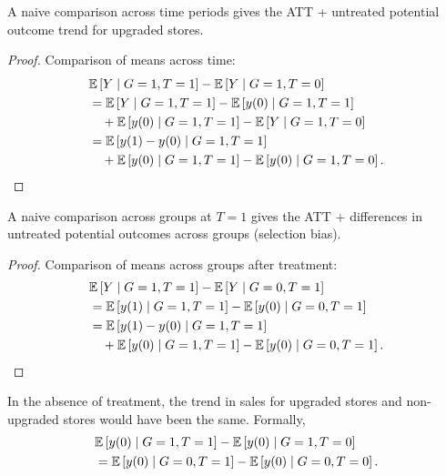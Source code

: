\begin{proposition}
	A naive comparison across time periods gives the ATT + untreated potential outcome trend for upgraded stores.
\end{proposition}
\begin{proof}
	Comparison of means across time:
	\begin{align*}
		&\mathbb{E}\left[Y \mid G=1, T=1\right] - \mathbb{E}\left[Y \mid G=1, T=0\right] \\
		&= \mathbb{E}\left[Y \mid G=1, T=1\right] - \mathbb{E}\left[y(0) \mid G=1, T=1\right] \\
		&\quad + \mathbb{E}\left[y(0) \mid G=1, T=1\right] - \mathbb{E}\left[Y \mid G=1, T=0\right] \\
		&= \mathbb{E}\left[y(1)-y(0) \mid G=1, T=1\right] \\
		&\quad + \mathbb{E}\left[y(0) \mid G=1, T=1\right] - \mathbb{E}\left[y(0) \mid G=1, T=0\right]
	.\end{align*}
\end{proof}

\begin{proposition}
	A naive comparison across groups at $T=1$ gives the ATT + differences in untreated potential outcomes across groups (selection bias).
\end{proposition}
\begin{proof}
	Comparison of means across groups after treatment:
	\begin{align*}
		&\mathbb{E}\left[Y \mid G=1, T=1\right] - \mathbb{E}\left[Y \mid G=0, T=1\right]\\
		&= \mathbb{E}\left[y(1) \mid G=1, T=1\right] - \mathbb{E}\left[y(0) \mid G=0, T=1\right] \\
		&= \mathbb{E}\left[y(1)-y(0) \mid G=1, T=1\right] \\
		&\quad + \mathbb{E}\left[y(0) \mid G=1, T=1\right] - \mathbb{E}\left[y(0) \mid G=0, T=1\right]
	.\end{align*}
\end{proof}

\begin{assumption}
	In the absence of treatment, the trend in sales for upgraded stores and non-upgraded stores would have been the same. Formally,
	\begin{align*}
		&\mathbb{E}\left[y(0) \mid G=1, T=1\right] - \mathbb{E}\left[y(0) \mid G=1, T=0\right] \\
		&= \mathbb{E}\left[y(0) \mid G=0, T=1\right] - \mathbb{E}\left[y(0) \mid G=0, T=0\right]
	.\end{align*}
\end{assumption}

